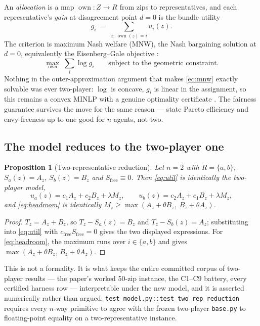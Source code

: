 \documentclass[11pt]{article}
\newtheorem{prop}{Proposition}
\theoremstyle{definition}
\newcommand{\Sfree}{S_{\mathrm{free}}}
\newcommand{\cfree}{c_{\mathrm{free}}}
\newcommand{\owner}{\operatorname{own}}
\begin{document}
An \emph{allocation} is a map $\owner:Z\to R$ from zips to representatives, and each
representative's \emph{gain} at disagreement point $d=0$ is the bundle utility
\begin{equation}\label{eq:gain}
g_i \;=\; \sum_{z:\,\owner(z)=i} u_i(z).
\end{equation}
The criterion is maximum Nash welfare (MNW), the Nash bargaining solution
\citep{nash1950} at $d=0$, equivalently the Eisenberg--Gale objective
\citep{eisenberg1959}:
\begin{equation}\label{eq:mnw}
\max_{\owner}\;\sum_i \log g_i \qquad\text{subject to the geometric constraint.}
\end{equation}
Nothing in the outer-approximation argument that makes \eqref{eq:mnw} exactly solvable was
ever two-player: $\log$ is concave, $g_i$ is linear in the assignment, so this remains a
convex MINLP with a genuine optimality certificate \citep{duran1986,fletcher1994}. The
fairness guarantee survives the move for the same reason ---
\citet{caragiannis2019} state Pareto efficiency and envy-freeness up to one good for $n$
agents, not two.

\subsection{The model reduces to the two-player one}

\begin{prop}[Two-representative reduction]\label{prop:reduce}
Let $n=2$ with $R=\{a,b\}$, $S_a(z)=A_z$, $S_b(z)=B_z$ and $\Sfree\equiv0$. Then
\eqref{eq:util} is identically the two-player model,
\[
u_a(z)=c_1A_z+c_2B_z+\lambda M_z,\qquad u_b(z)=c_2A_z+c_1B_z+\lambda M_z,
\]
and \eqref{eq:headroom} is identically $M_z\ge\max(A_z+\theta B_z,\;B_z+\theta A_z)$.
\end{prop}

\begin{proof}
$T_z = A_z+B_z$, so $T_z-S_a(z)=B_z$ and $T_z-S_b(z)=A_z$; substituting into
\eqref{eq:util} with $\cfree\Sfree=0$ gives the two displayed expressions. For
\eqref{eq:headroom}, the maximum runs over $i\in\{a,b\}$ and gives
$\max(A_z+\theta B_z,\,B_z+\theta A_z)$.
\end{proof}

This is not a formality. It is what keeps the entire committed corpus of two-player
results --- the paper's worked 50-zip instance, the C1--C9 battery, every certified
harness row --- interpretable under the new model, and it is asserted numerically rather
than argued: \texttt{test\_model.py::test\_two\_rep\_reduction} requires every $n$-way
primitive to agree with the frozen two-player \texttt{base.py} to floating-point equality
on a two-representative instance.
\end{document}
